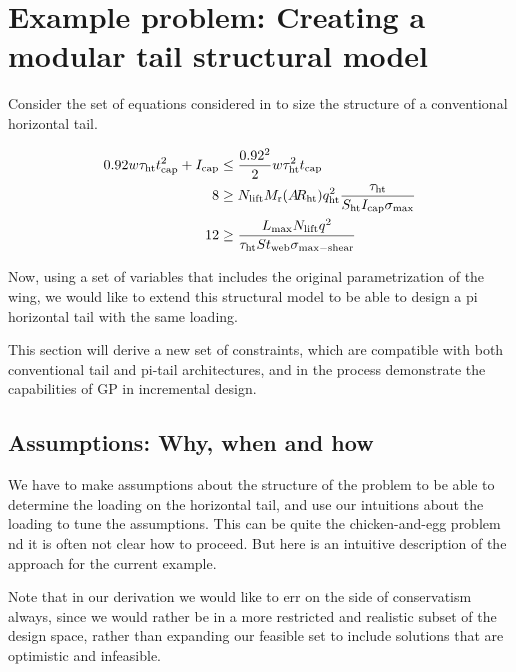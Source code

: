 \section{Example problem: Creating a modular tail structural model}

Consider the set of equations considered in \cite{SP_ac_design} to size
the structure of a conventional horizontal tail. 

\begin{align}
    0.92 w\tau_{\rm{ht}} t_{\rm{cap}}^2 + I_{\rm{cap}} &\leq \frac{0.92^2}{2}w\tau_{\rm{ht}}^2t_{\rm{cap}}\\
    8 &\geq N_{\rm{lift}}M_{\rm{r}}(A\hspace{-2.0pt}R_{\rm{ht}})q_{\rm{ht}}^2\frac{\tau_{\rm{ht}}}{S_{\rm{ht}} I_{\rm{cap}}\sigma_{\rm{max}}}\\
    12 &\geq \frac{L_{\rm{max}} N_{\rm{lift}} q^2}{\tau_{\rm{ht}} S t_{\rm{web}} \sigma_{\rm{max-shear}}}
\end{align}

Now, using a set of variables that includes the original parametrization of the wing, 
we would like to extend this structural model to be able to design a pi horizontal tail
with the same loading. 

This section will derive a new set of constraints, which are compatible with 
both conventional tail and pi-tail architectures, and in the process demonstrate the 
capabilities of \gls{GP} in incremental design. 



\subsection{Assumptions: Why, when and how}

We have to make assumptions about the structure of the problem to be able
to determine the loading on the horizontal tail, and use our intuitions about the 
loading to tune the assumptions. This can be quite the chicken-and-egg problem
nd it is often not clear how to proceed. But here is an 
intuitive description of the approach for the current example. 

Note that in our derivation we would like to err on the side of conservatism always, since we would
rather be in a more restricted and realistic subset of the design space, rather than 
expanding our feasible set to include solutions that are optimistic and infeasible. 

